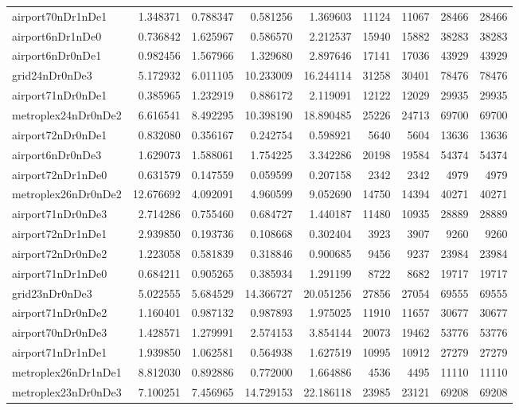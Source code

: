 \begin{longtable}{|l|r|r|r|r|r|r|r|r|}
airport70nDr1nDe1 & 1.348371 & 0.788347 & 0.581256 & 1.369603 & 11124 & 11067 & 28466 & 28466 \\
airport6nDr1nDe0 & 0.736842 & 1.625967 & 0.586570 & 2.212537 & 15940 & 15882 & 38283 & 38283 \\
airport6nDr0nDe1 & 0.982456 & 1.567966 & 1.329680 & 2.897646 & 17141 & 17036 & 43929 & 43929 \\
grid24nDr0nDe3 & 5.172932 & 6.011105 & 10.233009 & 16.244114 & 31258 & 30401 & 78476 & 78476 \\
airport71nDr0nDe1 & 0.385965 & 1.232919 & 0.886172 & 2.119091 & 12122 & 12029 & 29935 & 29935 \\
metroplex24nDr0nDe2 & 6.616541 & 8.492295 & 10.398190 & 18.890485 & 25226 & 24713 & 69700 & 69700 \\
airport72nDr0nDe1 & 0.832080 & 0.356167 & 0.242754 & 0.598921 & 5640 & 5604 & 13636 & 13636 \\
airport6nDr0nDe3 & 1.629073 & 1.588061 & 1.754225 & 3.342286 & 20198 & 19584 & 54374 & 54374 \\
airport72nDr1nDe0 & 0.631579 & 0.147559 & 0.059599 & 0.207158 & 2342 & 2342 & 4979 & 4979 \\
metroplex26nDr0nDe2 & 12.676692 & 4.092091 & 4.960599 & 9.052690 & 14750 & 14394 & 40271 & 40271 \\
airport71nDr0nDe3 & 2.714286 & 0.755460 & 0.684727 & 1.440187 & 11480 & 10935 & 28889 & 28889 \\
airport72nDr1nDe1 & 2.939850 & 0.193736 & 0.108668 & 0.302404 & 3923 & 3907 & 9260 & 9260 \\
airport72nDr0nDe2 & 1.223058 & 0.581839 & 0.318846 & 0.900685 & 9456 & 9237 & 23984 & 23984 \\
airport71nDr1nDe0 & 0.684211 & 0.905265 & 0.385934 & 1.291199 & 8722 & 8682 & 19717 & 19717 \\
grid23nDr0nDe3 & 5.022555 & 5.684529 & 14.366727 & 20.051256 & 27856 & 27054 & 69555 & 69555 \\
airport71nDr0nDe2 & 1.160401 & 0.987132 & 0.987893 & 1.975025 & 11910 & 11657 & 30677 & 30677 \\
airport70nDr0nDe3 & 1.428571 & 1.279991 & 2.574153 & 3.854144 & 20073 & 19462 & 53776 & 53776 \\
airport71nDr1nDe1 & 1.939850 & 1.062581 & 0.564938 & 1.627519 & 10995 & 10912 & 27279 & 27279 \\
metroplex26nDr1nDe1 & 8.812030 & 0.892886 & 0.772000 & 1.664886 & 4536 & 4495 & 11110 & 11110 \\
metroplex23nDr0nDe3 & 7.100251 & 7.456965 & 14.729153 & 22.186118 & 23985 & 23121 & 69208 & 69208 \\

\end{longtable}
